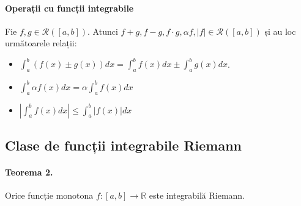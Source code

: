 \paragraph{Operații cu funcții integrabile}
Fie $f, g \in \mathcal{R}([a,b])$. Atunci $f+g, f-g, f \cdot g, \alpha f, \lvert f \rvert \in \mathcal{R}([a,b])$ și au
loc următoarele relații:
\begin{itemize}
    \item $\displaystyle\int_{a}^{b}(f(x) \pm g(x))dx = \displaystyle\int_{a}^{b}f(x)dx \pm \displaystyle\int_{a}^{b}g(x)dx$.
    \item $\displaystyle\int_{a}^{b}\alpha f(x)dx = \alpha\displaystyle\int_{a}^{b}f(x)dx$
    \item $\left\lvert \displaystyle\int_{a}^{b}f(x)dx \right\rvert \leq \displaystyle\int_{a}^{b} \lvert f(x) \rvert dx$
\end{itemize}

\subsection{Clase de funcții integrabile Riemann}
\paragraph{Teorema 2.}
Orice funcție monotona $f:[a,b] \rightarrow \mathbb{R}$ este integrabilă Riemann.

